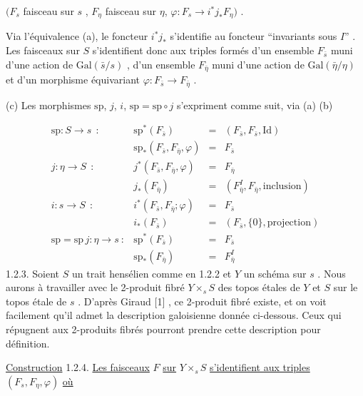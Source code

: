 $(F_s$ faisceau sur $s$ , $F_\eta$ faisceau sur $\eta$, $\varphi : F_s \longrightarrow i^* j_* F_\eta )$ .

Via l'équivalence (a), le foncteur $i^* j_*$ s'identifie au foncteur ``invariants sous $I$'' . Les faisceaux sur $S$ s'identifient donc aux triples formés d'un ensemble $F_{\bar{s}}$ muni d'une action de $\mathrm{Gal}(\bar{s}/s)$ , d'un ensemble $F_{\bar{\eta}}$ muni d'une action de $\mathrm{Gal}(\bar{\eta}/\eta)$ et d'un morphisme équivariant $\varphi : F_{\bar{s}} \longrightarrow F_{\bar{\eta}}$ .

(c) Les morphismes $\mathrm{sp}$, $j$, $i$, $\mathrm{sp} = \mathrm{sp} \circ j$ s'expriment comme suit, via (a) (b)

\begin{equation*}
\begin{array}{llcl}
\mathrm{sp} : S \longrightarrow s \ \ : & \mathrm{sp}^*(F_{\bar{s}}) & = & (F_{\bar{s}}, F_{\bar{s}}, \mathrm{Id}) \\[2pt]
& \mathrm{sp}_*(F_{\bar{s}}, F_{\bar{\eta}}, \varphi) & = & F_{\bar{s}} \\[2pt]
j : \eta \longrightarrow S \ \ : & j^*(F_{\bar{s}}, F_{\bar{\eta}}, \varphi) & = & F_{\bar{\eta}} \\[2pt]
& j_*(F_{\bar{\eta}}) & = & (F^{I}_{\bar{\eta}}, F_{\bar{\eta}}, \mathrm{inclusion}) \\[2pt]
i : s \longrightarrow S \ \ : & i^*(F_{\bar{s}}, F_{\bar{\eta}}; \varphi) & = & F_{\bar{s}} \\[2pt]
& i_*(F_{\bar{s}}) & = & (F_{\bar{s}}, \{0\}, \mathrm{projection}) \\[2pt]
\mathrm{sp} = \mathrm{sp}\, j : \eta \longrightarrow s \ : & \mathrm{sp}^*(F_{\bar{s}}) & = & F_{\bar{s}} \\[2pt]
& \mathrm{sp}_*(F_{\bar{\eta}}) & = & F^{I}_{\bar{\eta}}
\end{array}
\end{equation*}
1.2.3. Soient $S$ un trait hensélien comme en 1.2.2 et $Y$ un schéma sur $s$ . Nous aurons à travailler avec le 2-produit fibré $Y \times_s S$ des topos étales de $Y$ et $S$ sur le topos étale de $s$ . D'après Giraud [1] , ce 2-produit fibré existe, et on voit facilement qu'il admet la description galoisienne donnée ci-dessous. Ceux qui
répugnent aux 2-produits fibrés pourront prendre cette description pour définition.

\underline{Construction} 1.2.4. \underline{Les faisceaux} $F$ \underline{sur} $Y \times_s S$ \underline{s'identifient aux triples} $(F_s, F_\eta, \varphi )$ \underline{où}

